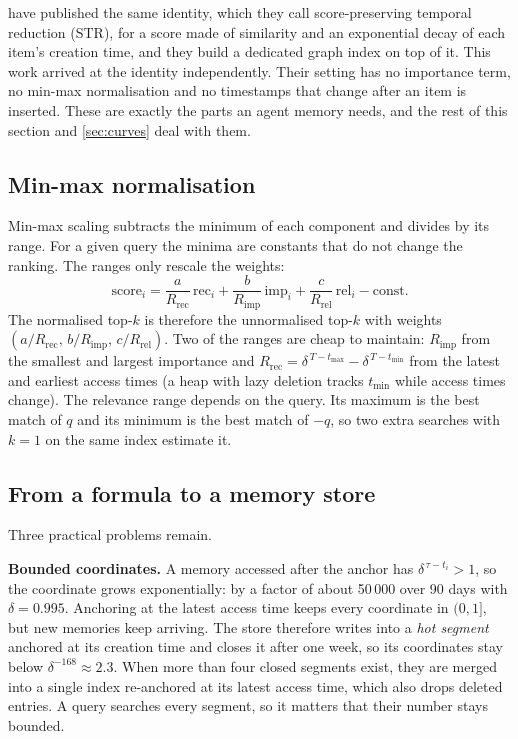 \documentclass[11pt,a4paper]{article}
\newcommand{\rec}{\mathrm{rec}}
\newcommand{\imp}{\mathrm{imp}}
\newcommand{\rel}{\mathrm{rel}}
\begin{document}
\citet{wei2026tango} have published the same identity, which they call score-preserving temporal reduction (STR), for a score made of similarity and an exponential decay of each item's creation time, and they build a dedicated graph index on top of it. This work arrived at the identity independently. Their setting has no importance term, no min-max normalisation and no timestamps that change after an item is inserted. These are exactly the parts an agent memory needs, and the rest of this section and \cref{sec:curves} deal with them.

\subsection{Min-max normalisation}

Min-max scaling subtracts the minimum of each component and divides by its range. For a given query the minima are constants that do not change the ranking. The ranges only rescale the weights:
\begin{equation}
\mathrm{score}_i=\frac{a}{R_{\rec}}\,\rec_i+\frac{b}{R_{\imp}}\,\imp_i+\frac{c}{R_{\rel}}\,\rel_i-\text{const}.
\end{equation}
The normalised top-$k$ is therefore the unnormalised top-$k$ with weights $(a/R_{\rec},\,b/R_{\imp},\,c/R_{\rel})$. Two of the ranges are cheap to maintain: $R_{\imp}$ from the smallest and largest importance and $R_{\rec}=\delta^{\,T-t_{\max}}-\delta^{\,T-t_{\min}}$ from the latest and earliest access times (a heap with lazy deletion tracks $t_{\min}$ while access times change). The relevance range depends on the query. Its maximum is the best match of $q$ and its minimum is the best match of $-q$, so two extra searches with $k=1$ on the same index estimate it.

\subsection{From a formula to a memory store}

Three practical problems remain.

\textbf{Bounded coordinates.} A memory accessed after the anchor has $\delta^{\,\tau-t_i}>1$, so the coordinate grows exponentially: by a factor of about 50\,000 over 90 days with $\delta=0.995$. Anchoring at the latest access time keeps every coordinate in $(0,1]$, but new memories keep arriving. The store therefore writes into a \emph{hot segment} anchored at its creation time and closes it after one week, so its coordinates stay below $\delta^{-168}\approx2.3$. When more than four closed segments exist, they are merged into a single index re-anchored at its latest access time, which also drops deleted entries. A query searches every segment, so it matters that their number stays bounded.
\end{document}
